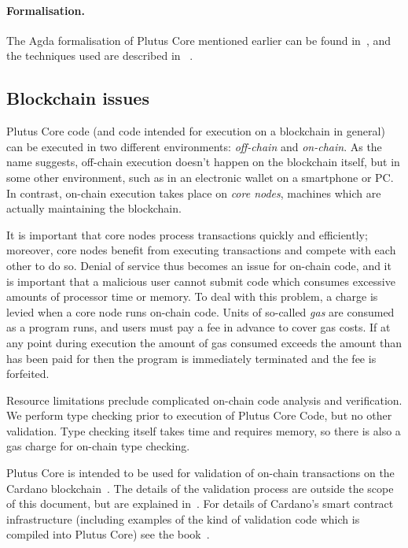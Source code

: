 \documentclass[a4paper]{article}
\begin{document}
\paragraph{Formalisation.} The Agda formalisation of Plutus Core mentioned earlier
can be found in~\citep{Plutus-metatheory-repo},
and the techniques used are described in ~\citep{System-F-in-Agda}.

\subsection{Blockchain issues}
Plutus Core code (and code intended for execution on a blockchain in
general) can be executed in two different environments:
\textit{off-chain} and \textit{on-chain}.  As the name suggests,
off-chain execution doesn't happen on the blockchain itself, but in
some other environment, such as in an electronic wallet on a
smartphone or PC.  In contrast, on-chain execution takes place on
\textit{core nodes}, machines which are actually maintaining the
blockchain.

It is important that core nodes process transactions quickly and
efficiently; moreover, core nodes benefit from executing transactions
and compete with each other to do so.  Denial of service thus becomes
an issue for on-chain code, and it is important that a malicious user
cannot submit code which consumes excessive amounts of processor time
or memory. To deal with this problem, a charge is levied when a core
node runs on-chain code.  Units of so-called \textit{gas} are consumed
as a program runs, and users must pay a fee in advance to cover gas
costs.  If at any point during execution the amount of gas consumed
exceeds the amount than has been paid for then the program is
immediately terminated and the fee is forfeited.

Resource limitations preclude complicated on-chain code analysis
and verification.  We perform type checking prior to execution of
Plutus Core Code, but no other validation.  Type checking itself takes
time and requires memory, so there is also a gas charge for on-chain
type checking.

Plutus Core is intended to be used for validation of on-chain
transactions on the Cardano blockchain~\citep{Cardano}.  The details
of the validation process are outside the scope of this document, but
are explained in~\citep{EUTXO}. For details of Cardano's smart
contract infrastructure (including examples of the kind of validation
code which is compiled into Plutus Core) see the
book~\citep{Plutus-book}.
\end{document}
